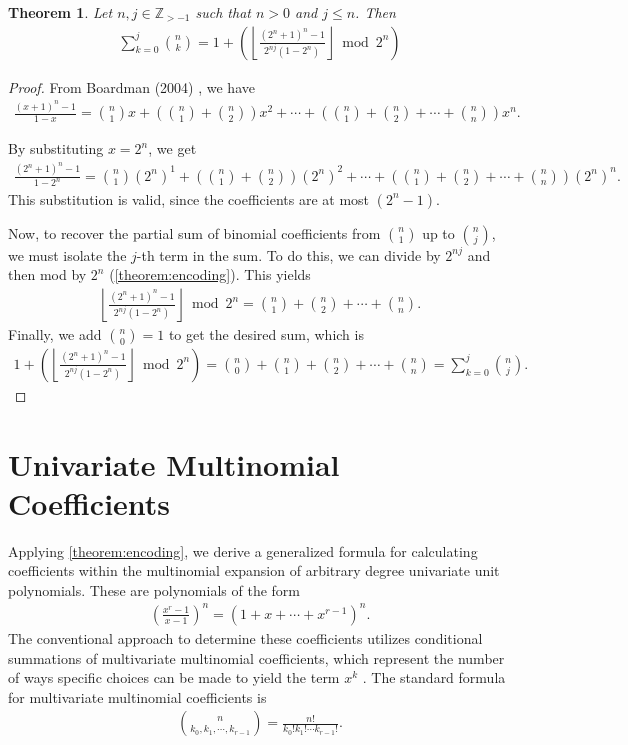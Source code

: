 \documentclass{article}
\theoremstyle{plain}
\newtheorem{theorem}{Theorem}[section]
\newcommand{\floor}[1]{\left\lfloor #1 \right\rfloor}
\newcommand{\Z}{\mathbb{Z}}
\begin{document}
\begin{theorem} \label{proof:binomialcoeffpartialsums2}
Let $n,j \in \Z_{>-1}$ such that $n>0$ and $j \leq n$. Then
\begin{align*}
\sum_{k=0}^{j} \binom{n}{k} = 1 + \left( \floor{ \frac{(2^n+1)^n - 1}{2^{nj}(1-2^n)} } \bmod 2^n \right)
\end{align*}
\end{theorem}
\begin{proof}
From Boardman (2004) \cite{boardman2004eggdropnumbers}, we have
\begin{align*}
\frac{(x+1)^n - 1}{1-x} = 
\binom{n}{1} x
+ \left( \binom{n}{1} + \binom{n}{2} \right) x^2
+ \cdots
+ \left( \binom{n}{1} + \binom{n}{2} + \cdots + \binom{n}{n} \right) x^n .
\end{align*}

By substituting $x=2^n$, we get
\begin{align*}
\frac{(2^n+1)^n - 1}{1-2^n} = 
\binom{n}{1} (2^n)^1
+ \left( \binom{n}{1} + \binom{n}{2} \right) (2^n)^2
+ \cdots
+ \left( \binom{n}{1} + \binom{n}{2} + \cdots + \binom{n}{n} \right) (2^n)^n .
\end{align*}
This substitution is valid, since the coefficients are at most $(2^n-1)$.

Now, to recover the partial sum of binomial coefficients from $\binom{n}{1}$ up to $\binom{n}{j}$, we must isolate the $j$-th term in the sum. To do this, we can divide by $2^{nj}$ and then mod by $2^n$ (\cref{theorem:encoding}). This yields
\begin{align*}
\floor{ \frac{(2^n+1)^n - 1}{2^{nj}(1-2^n)} } \bmod 2^n = 
\binom{n}{1} + \binom{n}{2} + \cdots + \binom{n}{n} .
\end{align*}
Finally, we add $\binom{n}{0} = 1$ to get the desired sum, which is
\begin{align*}
1 + \left( \floor{ \frac{(2^n+1)^n - 1}{2^{nj}(1-2^n)} } \bmod 2^n \right) = 
\binom{n}{0} + \binom{n}{1} + \binom{n}{2} + \cdots + \binom{n}{n} = \sum_{k=0}^j \binom{n}{j} .
\end{align*}
\end{proof}

\section{Univariate Multinomial Coefficients} \label{section:multinomialformula}
Applying \cref{theorem:encoding}, we derive a generalized formula for calculating coefficients within the multinomial expansion of arbitrary degree univariate unit polynomials. These are polynomials of the form
\begin{align*}
    \left(\frac{x^{r}-1}{x-1}\right)^n = (1 + x + \cdots + x^{r-1})^n  .
\end{align*}
The conventional approach to determine these coefficients utilizes conditional summations of multivariate multinomial coefficients, which represent the number of ways specific choices can be made to yield the term \(x^k\) \cite{graham1994concrete}. The standard formula for multivariate multinomial coefficients is
\begin{align*}
    \binom{n}{k_0, k_1, \cdots, k_{r-1}} = \frac{n!}{k_0! k_1! \cdots k_{r-1}!} .
\end{align*}
\end{document}
